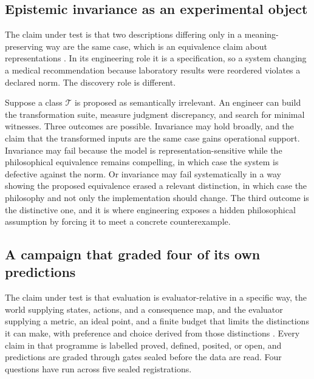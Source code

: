 \documentclass[11pt]{article}
\theoremstyle{remark}
\begin{document}
\subsection{Epistemic invariance as an experimental object}

The claim under test is that two descriptions differing only in a
meaning-preserving way are the same case, which is an equivalence claim about
representations \citep{bond2026pe}. In its engineering role it is a specification,
so a system changing a medical recommendation because laboratory results were
reordered violates a declared norm. The discovery role is different.

Suppose a class $\mathcal{T}$ is proposed as semantically irrelevant. An engineer
can build the transformation suite, measure judgment discrepancy, and search for
minimal witnesses. Three outcomes are possible. Invariance may hold broadly, and
the claim that the transformed inputs are the same case gains operational support.
Invariance may fail because the model is representation-sensitive while the
philosophical equivalence remains compelling, in which case the system is defective
against the norm. Or invariance may fail systematically in a way showing the
proposed equivalence erased a relevant distinction, in which case the philosophy and
not only the implementation should change. The third outcome is the distinctive
one, and it is where engineering exposes a hidden philosophical assumption by
forcing it to meet a concrete counterexample.

\subsection{A campaign that graded four of its own predictions}

The claim under test is that evaluation is evaluator-relative in a specific way,
the world supplying states, actions, and a consequence map, and the evaluator
supplying a metric, an ideal point, and a finite budget that limits the
distinctions it can make, with preference and choice derived from those
distinctions \citep{bond2026get}. Every claim in that programme is labelled proved,
defined, posited, or open, and predictions are graded through gates sealed before
the data are read. Four questions have run across five sealed registrations.
\end{document}
